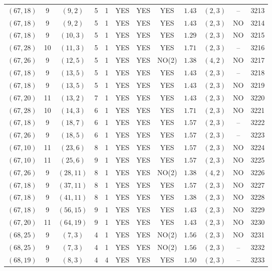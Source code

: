 \begin{longtable}{|c|c|c|c|c|c|c|c|c|c|c|c|}
$(67,18)$ & 9 & $(9,2)$ & 5 & 1 & YES & YES & YES & $1.43$ & $(2,3)$ & -- & 3213\\
$(67,18)$ & 9 & $(9,2)$ & 5 & 1 & YES & YES & YES & $1.43$ & $(2,3)$ & NO & 3214\\
$(67,18)$ & 9 & $(10,3)$ & 5 & 1 & YES & YES & YES & $1.29$ & $(2,3)$ & NO & 3215\\
$(67,28)$ & 10 & $(11,3)$ & 5 & 1 & YES & YES & YES & $1.71$ & $(2,3)$ & -- & 3216\\
$(67,26)$ & 9 & $(12,5)$ & 5 & 1 & YES & YES & NO(2) & $1.38$ & $(4,2)$ & NO & 3217\\
$(67,18)$ & 9 & $(13,5)$ & 5 & 1 & YES & YES & YES & $1.43$ & $(2,3)$ & -- & 3218\\
$(67,18)$ & 9 & $(13,5)$ & 5 & 1 & YES & YES & YES & $1.43$ & $(2,3)$ & NO & 3219\\
$(67,20)$ & 11 & $(13,2)$ & 7 & 1 & YES & YES & YES & $1.43$ & $(2,3)$ & NO & 3220\\
$(67,28)$ & 10 & $(14,3)$ & 6 & 1 & YES & YES & YES & $1.71$ & $(2,3)$ & NO & 3221\\
$(67,18)$ & 9 & $(18,7)$ & 6 & 1 & YES & YES & YES & $1.57$ & $(2,3)$ & -- & 3222\\
$(67,26)$ & 9 & $(18,5)$ & 6 & 1 & YES & YES & YES & $1.57$ & $(2,3)$ & -- & 3223\\
$(67,10)$ & 11 & $(23,6)$ & 8 & 1 & YES & YES & YES & $1.57$ & $(2,3)$ & NO & 3224\\
$(67,10)$ & 11 & $(25,6)$ & 9 & 1 & YES & YES & YES & $1.57$ & $(2,3)$ & NO & 3225\\
$(67,26)$ & 9 & $(28,11)$ & 8 & 1 & YES & YES & NO(2) & $1.38$ & $(4,2)$ & NO & 3226\\
$(67,18)$ & 9 & $(37,11)$ & 8 & 1 & YES & YES & YES & $1.57$ & $(2,3)$ & NO & 3227\\
$(67,18)$ & 9 & $(41,11)$ & 8 & 1 & YES & YES & YES & $1.38$ & $(2,3)$ & NO & 3228\\
$(67,18)$ & 9 & $(56,15)$ & 9 & 1 & YES & YES & YES & $1.43$ & $(2,3)$ & NO & 3229\\
$(67,20)$ & 11 & $(64,19)$ & 9 & 1 & YES & YES & YES & $1.43$ & $(2,3)$ & NO & 3230\\
$(68,25)$ & 9 & $(7,3)$ & 4 & 1 & YES & YES & NO(2) & $1.56$ & $(2,3)$ & NO & 3231\\
$(68,25)$ & 9 & $(7,3)$ & 4 & 1 & YES & YES & NO(2) & $1.56$ & $(2,3)$ & -- & 3232\\
$(68,19)$ & 9 & $(8,3)$ & 4 & 4 & YES & YES & YES & $1.50$ & $(2,3)$ & -- & 3233\\

\end{longtable}
